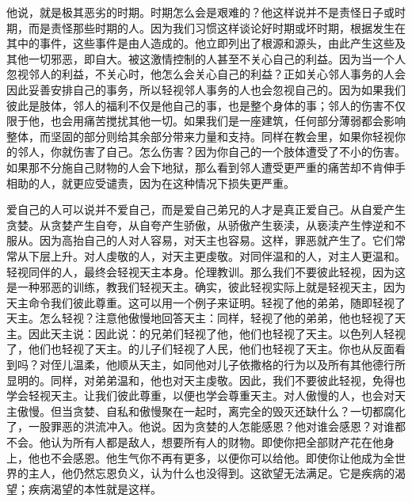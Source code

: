 他说，就是极其恶劣的时期。时期怎么会是艰难的？他这样说并不是责怪日子或时期，而是责怪那些时期的人。因为我们习惯这样谈论好时期或坏时期，根据发生在其中的事件，这些事件是由人造成的。他立即列出了根源和源头，由此产生这些及其他一切邪恶，即自大。被这激情控制的人甚至不关心自己的利益。因为当一个人忽视邻人的利益，不关心时，他怎么会关心自己的利益？正如关心邻人事务的人会因此妥善安排自己的事务，所以轻视邻人事务的人也会忽视自己的。因为如果我们彼此是肢体，邻人的福利不仅是他自己的事，也是整个身体的事；邻人的伤害不仅限于他，也会用痛苦搅扰其他一切。如果我们是一座建筑，任何部分薄弱都会影响整体，而坚固的部分则给其余部分带来力量和支持。同样在教会里，如果你轻视你的邻人，你就伤害了自己。怎么伤害？因为你自己的一个肢体遭受了不小的伤害。如果那不分施自己财物的人会下地狱，那么看到邻人遭受更严重的痛苦却不肯伸手相助的人，就更应受谴责，因为在这种情况下损失更严重。\par

爱自己的人可以说并不爱自己，而是爱自己弟兄的人才是真正爱自己。从自爱产生贪婪。从贪婪产生自夸，从自夸产生骄傲，从骄傲产生亵渎，从亵渎产生悖逆和不服从。因为高抬自己的人对人容易，对天主也容易。这样，罪恶就产生了。它们常常从下层上升。对人虔敬的人，对天主更虔敬。对同伴温和的人，对主人更温和。轻视同伴的人，最终会轻视天主本身。伦理教训。那么我们不要彼此轻视，因为这是一种邪恶的训练，教我们轻视天主。确实，彼此轻视实际上就是轻视天主，因为天主命令我们彼此尊重。这可以用一个例子来证明。轻视了他的弟弟，随即轻视了天主。怎么轻视？注意他傲慢地回答天主：同样，轻视了他的弟弟，他也轻视了天主。因此天主说：因此说：的兄弟们轻视了他，他们也轻视了天主。以色列人轻视了，他们也轻视了天主。的儿子们轻视了人民，他们也轻视了天主。你也从反面看到吗？对侄儿温柔，他顺从天主，如同他对儿子依撒格的行为以及所有其他德行所显明的。同样，对弟弟温和，他也对天主虔敬。因此，我们不要彼此轻视，免得也学会轻视天主。让我们彼此尊重，以便也学会尊重天主。对人傲慢的人，也会对天主傲慢。但当贪婪、自私和傲慢聚在一起时，离完全的毁灭还缺什么？一切都腐化了，一股罪恶的洪流冲入。他说。因为贪婪的人怎能感恩？他对谁会感恩？对谁都不会。他认为所有人都是敌人，想要所有人的财物。即使你把全部财产花在他身上，他也不会感恩。他生气你不再有更多，以便你可以给他。即使你让他成为全世界的主人，他仍然忘恩负义，认为什么也没得到。这欲望无法满足。它是疾病的渴望；疾病渴望的本性就是这样。\par

